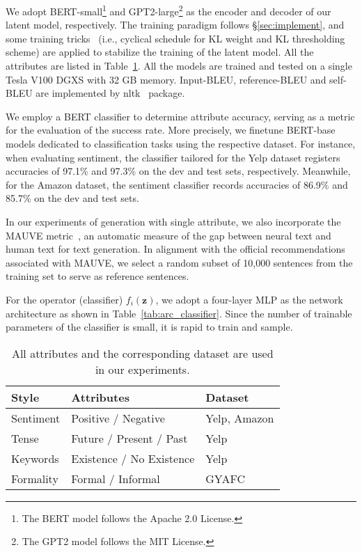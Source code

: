 \documentclass[11pt]{article}
\begin{document}
We adopt BERT-small\footnote{The BERT model follows the Apache 2.0 License.} and GPT2-large\footnote{The GPT2 model follows the MIT License.}  as the encoder and decoder of our latent model, respectively. The training paradigm follows \S\ref{sec:implement}, and some training tricks~\cite{li-etal-2020-optimus} (i.e., cyclical schedule for KL weight and KL thresholding scheme) are applied to stabilize the training of the latent model. All the attributes are listed in Table~\ref{tab:operators}. 
All the models are trained and tested on a single Tesla V100 DGXS with 32 GB memory.
Input-BLEU, reference-BLEU and self-BLEU are implemented by nltk~\cite{DBLP:books/daglib/0022921} package. 



We employ a BERT classifier to determine attribute accuracy, serving as a metric for the evaluation of the success rate. More precisely, we finetune BERT-base models dedicated to classification tasks using the respective dataset. For instance, when evaluating sentiment, the classifier tailored for the Yelp dataset registers accuracies of 97.1\% and 97.3\% on the dev and test sets, respectively. Meanwhile, for the Amazon dataset, the sentiment classifier records accuracies of 86.9\% and 85.7\% on the dev and test sets.

In our experiments of generation with single attribute, we also incorporate the MAUVE metric~\citep{pillutla2021mauve}, an automatic measure of the gap between neural text and human text for text generation. In alignment with the official recommendations associated with MAUVE, we select a random subset of 10,000 sentences from the training set to serve as reference sentences.

For the operator (classifier) $f_i(\bm z)$, we adopt a four-layer MLP as the network architecture as shown in Table~\ref{tab:arc_classifier}. Since the number of trainable parameters of the classifier is small, it is rapid to train and sample. 
\begin{table}[ht]
    \centering
\begin{tabular}{l|l |l}
    \toprule
        Style & Attributes  & Dataset\\\midrule
         Sentiment& Positive / Negative  &Yelp, Amazon\\Tense& Future / Present / Past & Yelp \\
Keywords& Existence / No Existence & Yelp\\Formality & Formal / Informal & GYAFC \\
\bottomrule
    \end{tabular}
    \caption{All attributes and the corresponding dataset are used in our experiments.} \label{tab:operators}
\end{table}
\end{document}
